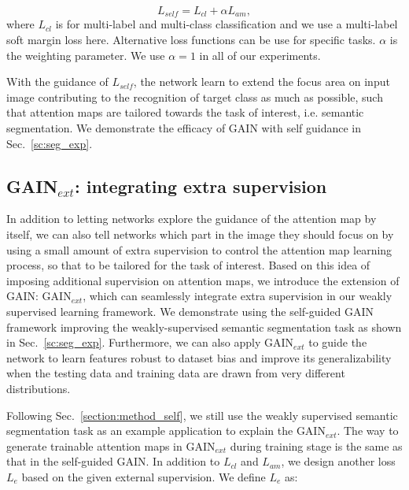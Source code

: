 \documentclass[10pt,twocolumn,letterpaper]{article}
\begin{document}
\begin{equation}
\label{eq:self_guidance_loss}
{L_{self}} = {L_{cl}} + \alpha{L_{am}},
\end{equation}
where ${L_{cl}}$ is for multi-label and multi-class classification and we use a multi-label soft margin loss here. Alternative loss functions can be use for specific tasks. $\alpha$ is the weighting parameter. We use $\alpha = 1$ in all of our experiments.

With the guidance of $L_{self}$, the network learn to extend the focus area on input image contributing to the recognition of target class as much as possible, such that attention maps are tailored towards the task of interest, i.e. semantic segmentation. We demonstrate the efficacy of GAIN with self guidance in Sec.~\ref{sc:seg_exp}.



\subsection{GAIN$_{ext}$: integrating extra supervision} \label{section:method_human_guided}

In addition to letting networks explore the guidance of the attention map by itself, we can also tell networks which part in the image they should focus on by using a small amount of extra supervision to control the attention map learning process, so that to be tailored for the task of interest. Based on this idea of imposing additional supervision on attention maps, we introduce the extension of GAIN: GAIN$_{ext}$, which can seamlessly integrate extra supervision in our weakly supervised learning framework. We demonstrate using the self-guided GAIN framework improving the weakly-supervised semantic segmentation task as shown in Sec.~\ref{sc:seg_exp}. Furthermore, we can also apply GAIN$_{ext}$ to guide the network to learn features robust to dataset bias and improve its generalizability when the testing data and training data are drawn from very different distributions.




Following Sec.~\ref{section:method_self}, we still use the weakly supervised semantic segmentation task as an example application to explain the GAIN$_{ext}$. The way to generate trainable attention maps in GAIN$_{ext}$ during training stage is the same as that in the self-guided GAIN. In addition to $L_{cl}$ and $L_{am}$, we design another loss $L_e$ based on the given external supervision. We define $L_e$ as:
\end{document}
